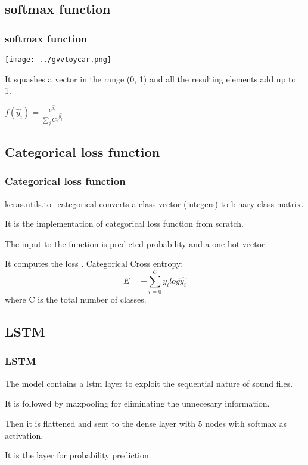 \documentclass{beamer}
\theoremstyle{remark}
\numberwithin{equation}{section}
\begin{document}
\begin{frame}
\section{softmax function}
\frametitle{softmax function}
\texttt{[image: ../gvvtoycar.png]} 



It squashes a vector in the range (0, 1) and all the resulting elements add up to 1.



$f(\hat{y_i})=\frac{e^{\hat{y_i}}}{\sum_{j}{C}e^{\hat{y_j}}}$
\end{frame}
\begin{frame}
\section{Categorical loss function}
\frametitle{Categorical loss function}
keras.utils.to\_categorical converts\: a \:class\: vector\: (integers)\: to\: binary\: class\: matrix. 

It is the implementation of categorical loss function from scratch.

The input to the function is predicted probability and a one hot vector.

It computes the loss .
Categorical Cross entropy:
$$E = -\sum_{i=0}^{C} {y_i}{log{\hat{y_i}}} $$
where C is the total number of classes.
\end{frame}

\begin{frame}
\section{LSTM}
\frametitle{LSTM}
The model contains a lstm layer to exploit the sequential nature of sound files.

 
It is followed by maxpooling for eliminating the unnecesary information.

Then it is flattened and sent to the dense layer with 5 nodes with softmax as activation.

It is the layer for probability prediction.
\end{frame}


%
%  
%
%
\end{document}
